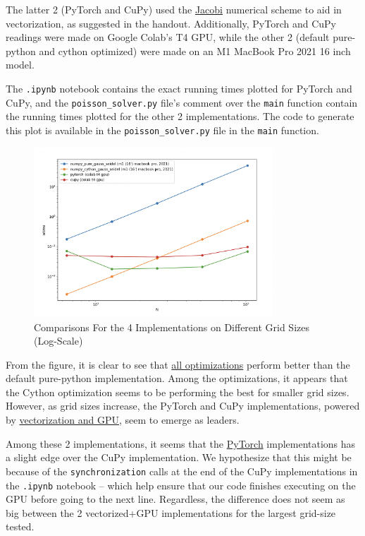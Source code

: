 \documentclass[a4paper,12pt]{article}
\begin{document}
The latter 2 (PyTorch and CuPy) used the \underline{Jacobi} numerical scheme to aid in vectorization, as suggested in the handout. Additionally, PyTorch and CuPy readings were made on Google Colab's T4 GPU, while the other 2 (default pure-python and cython optimized) were made on an M1 MacBook Pro 2021 16 inch model. 

The \verb|.ipynb| notebook contains the exact running times plotted for PyTorch and CuPy, and the \verb|poisson_solver.py| file's comment over the \verb|main| function contain the running times plotted for the other 2 implementations. The code to generate this plot is available in the \verb|poisson_solver.py| file in the \verb|main| function.

\begin{figure}[H]
  \centering
  \includegraphics[width=0.8\textwidth]{images/ex1_all4_comparison.png}
  \caption{Comparisons For the 4 Implementations on Different Grid Sizes (Log-Scale)}
\end{figure}

From the figure, it is clear to see that \underline{all optimizations} perform better than the default pure-python implementation. Among the optimizations, it appears that the Cython optimization seems to be performing the best for smaller grid sizes. However, as grid sizes increase, the PyTorch and CuPy implementations, powered by \underline{vectorization and GPU}, seem to emerge as leaders. 

Among these 2 implementations, it seems that the \underline{PyTorch} implementations has a slight edge over the CuPy implementation. We hypothesize that this might be because of the \verb|synchronization| calls at the end of the CuPy implementations in the \verb|.ipynb| notebook -- which help ensure that our code finishes executing on the GPU before going to the next line. Regardless, the difference does not seem as big between the 2 vectorized+GPU implementations for the largest grid-size tested. 
\end{document}
